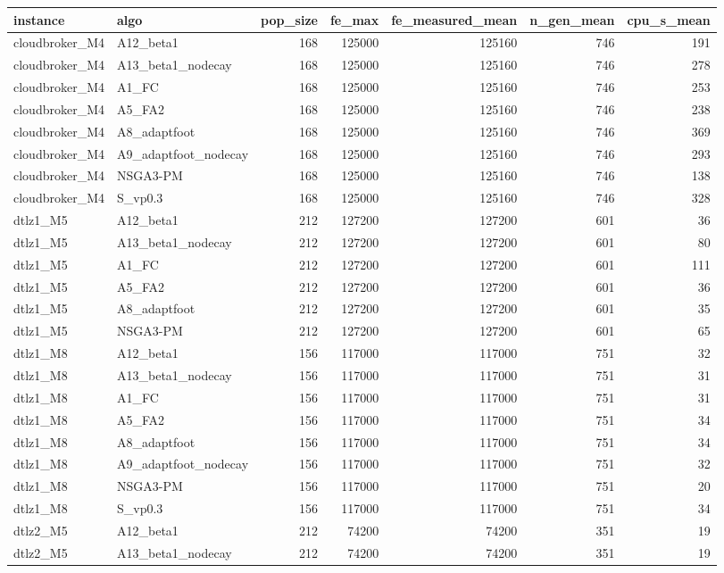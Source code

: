 \begin{tabular}{llrrrrr}
\toprule
instance & algo & pop_size & fe_max & fe_measured_mean & n_gen_mean & cpu_s_mean \\
\midrule
cloudbroker_M4 & A12_beta1 & 168 & 125000 & 125160 & 746 & 191 \\
cloudbroker_M4 & A13_beta1_nodecay & 168 & 125000 & 125160 & 746 & 278 \\
cloudbroker_M4 & A1_FC & 168 & 125000 & 125160 & 746 & 253 \\
cloudbroker_M4 & A5_FA2 & 168 & 125000 & 125160 & 746 & 238 \\
cloudbroker_M4 & A8_adaptfoot & 168 & 125000 & 125160 & 746 & 369 \\
cloudbroker_M4 & A9_adaptfoot_nodecay & 168 & 125000 & 125160 & 746 & 293 \\
cloudbroker_M4 & NSGA3-PM & 168 & 125000 & 125160 & 746 & 138 \\
cloudbroker_M4 & S_vp0.3 & 168 & 125000 & 125160 & 746 & 328 \\
dtlz1_M5 & A12_beta1 & 212 & 127200 & 127200 & 601 & 36 \\
dtlz1_M5 & A13_beta1_nodecay & 212 & 127200 & 127200 & 601 & 80 \\
dtlz1_M5 & A1_FC & 212 & 127200 & 127200 & 601 & 111 \\
dtlz1_M5 & A5_FA2 & 212 & 127200 & 127200 & 601 & 36 \\
dtlz1_M5 & A8_adaptfoot & 212 & 127200 & 127200 & 601 & 35 \\
dtlz1_M5 & NSGA3-PM & 212 & 127200 & 127200 & 601 & 65 \\
dtlz1_M8 & A12_beta1 & 156 & 117000 & 117000 & 751 & 32 \\
dtlz1_M8 & A13_beta1_nodecay & 156 & 117000 & 117000 & 751 & 31 \\
dtlz1_M8 & A1_FC & 156 & 117000 & 117000 & 751 & 31 \\
dtlz1_M8 & A5_FA2 & 156 & 117000 & 117000 & 751 & 34 \\
dtlz1_M8 & A8_adaptfoot & 156 & 117000 & 117000 & 751 & 34 \\
dtlz1_M8 & A9_adaptfoot_nodecay & 156 & 117000 & 117000 & 751 & 32 \\
dtlz1_M8 & NSGA3-PM & 156 & 117000 & 117000 & 751 & 20 \\
dtlz1_M8 & S_vp0.3 & 156 & 117000 & 117000 & 751 & 34 \\
dtlz2_M5 & A12_beta1 & 212 & 74200 & 74200 & 351 & 19 \\
dtlz2_M5 & A13_beta1_nodecay & 212 & 74200 & 74200 & 351 & 19 \\

\end{tabular}
